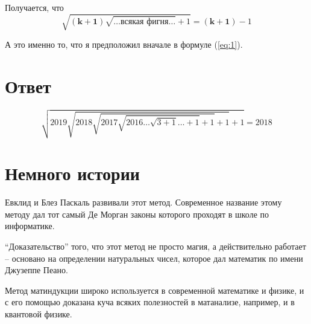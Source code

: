 \documentclass{article}
\begin{document}
Получается, что
$$\sqrt{\boldsymbol{(k+1)}{}\sqrt{\text{\ldots{}всякая фигня\ldots{}}}+1}=\boldsymbol{(k+1)}-1$$

А это именно то, что я предположил вначале в формуле (\ref{eq:1}).

\section{Ответ}
$$\sqrt{2019{}\sqrt{2018\sqrt{2017\sqrt{2016\dots\sqrt{3+1}\dots+1}+1}+1}+1}=2018$$

\section{Немного истории}
Евклид и Блез Паскаль развивали этот метод. Современное название этому методу дал тот самый Де Морган законы которого проходят в школе по информатике.

``Доказательство'' того, что этот метод не просто магия, а действительно работает -- основано на определении натуральных чисел, которое дал математик по имени Джузеппе Пеано.

Метод матиндукции широко используется в современной математике и физике, и с его помощью доказана куча всяких полезностей в матанализе, например, и в квантовой физике.
\end{document}
